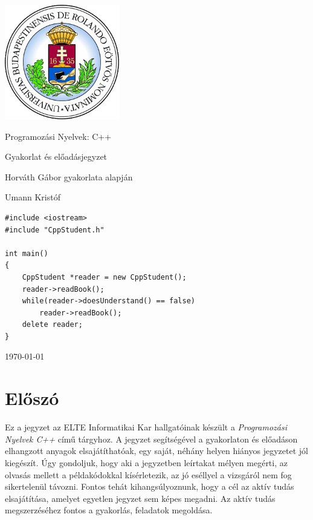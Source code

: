 \documentclass[a4paper,11.5pt,table]{article}
\begin{document}
	\setlength\parindent{0pt}
	\def\<{<\hspace{0mm}<}
	
	\theoremstyle{definition}
	\newtheorem{note}{Megjegyzés}[subsection]
	\begin{titlepage}
		\vspace*{2cm}
		\centering
		\includegraphics[width=5cm]{elte_cimer}
		
		\vspace*{2cm}
		{\Huge Programozási Nyelvek: C++ }
		
		\vspace{1cm}
		{\huge Gyakorlat és előadásjegyzet}
		
		\vspace*{5mm}
		{\large Horváth Gábor gyakorlata alapján}
		\vspace*{1.5cm}
		
		{\large Umann Kristóf}
		\vfill
		
		\begin{lstlisting}[frame=trbl, linewidth=12.6cm, xleftmargin=4.5cm, emph={CppStudent}]
#include <iostream>
#include "CppStudent.h"

int main()
{
	CppStudent *reader = new CppStudent();
	reader->readBook();
	while(reader->doesUnderstand() == false)
		reader->readBook();	
	delete reader;
}
		\end{lstlisting}
		\vfill
		
		\vspace*{1cm}
		\today
	\end{titlepage}
	\tableofcontents
	\pagebreak
	\section{Előszó}
	Ez a jegyzet az ELTE Informatikai Kar hallgatóinak készült a \emph{Programozási Nyelvek C++} című tárgyhoz. A jegyzet segítségével a gyakorlaton és előadáson elhangzott anyagok elsajátíthatóak, egy saját, néhány helyen hiányos jegyzetet jól kiegészít. Úgy gondoljuk, hogy aki a jegyzetben leírtakat mélyen megérti, az olvasás mellett a példakódokkal kísérletezik, az jó eséllyel a vizsgáról nem fog sikertelenül távozni. Fontos tehát kihangsúlyoznunk, hogy a cél az aktív tudás elsajátítása, amelyet egyetlen jegyzet sem képes megadni. Az aktív tudás megszerzéséhez fontos a gyakorlás, feladatok megoldása.
	
\end{document}
